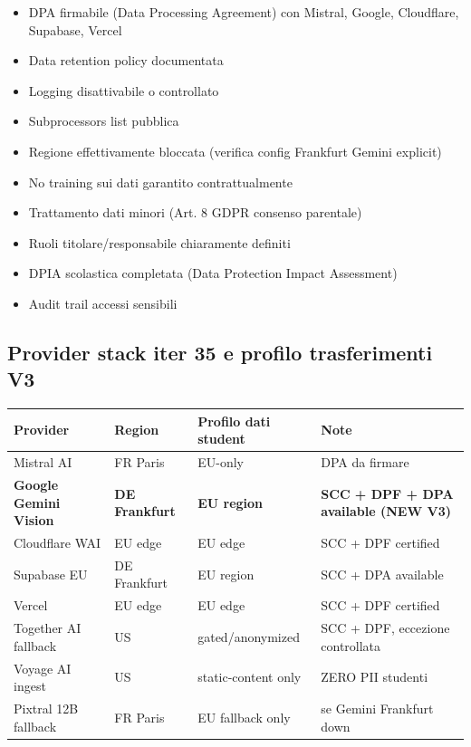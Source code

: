 \documentclass[12pt,a4paper]{article}
\begin{document}
\begin{itemize}[leftmargin=*]
  \item DPA firmabile (Data Processing Agreement) con Mistral, Google, Cloudflare, Supabase, Vercel
  \item Data retention policy documentata
  \item Logging disattivabile o controllato
  \item Subprocessors list pubblica
  \item Regione effettivamente bloccata (verifica config Frankfurt Gemini explicit)
  \item No training sui dati garantito contrattualmente
  \item Trattamento dati minori (Art. 8 GDPR consenso parentale)
  \item Ruoli titolare/responsabile chiaramente definiti
  \item DPIA scolastica completata (Data Protection Impact Assessment)
  \item Audit trail accessi sensibili
\end{itemize}

\subsection*{Provider stack iter 35 e profilo trasferimenti V3}

\begin{center}
\begin{tabular}{llll}
\toprule
\textbf{Provider} & \textbf{Region} & \textbf{Profilo dati student} & \textbf{Note} \\
\midrule
Mistral AI            & FR Paris       & EU-only            & DPA da firmare \\
\textbf{Google Gemini Vision} & \textbf{DE Frankfurt} & \textbf{EU region} & \textbf{SCC + DPF + DPA available (NEW V3)} \\
Cloudflare WAI        & EU edge        & EU edge            & SCC + DPF certified \\
Supabase EU           & DE Frankfurt   & EU region          & SCC + DPA available \\
Vercel                & EU edge        & EU edge            & SCC + DPF certified \\
\hline
Together AI fallback  & US             & gated/anonymized   & SCC + DPF, eccezione controllata \\
Voyage AI ingest      & US             & static-content only & ZERO PII studenti \\
Pixtral 12B fallback  & FR Paris       & EU fallback only   & se Gemini Frankfurt down \\
\bottomrule
\end{tabular}
\end{center}
\end{document}
